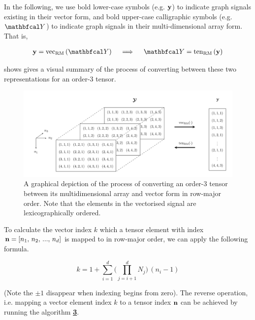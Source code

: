 In the following, we use bold lower-case symbols (e.g. $\mathbf{y}$) to indicate graph signals existing in their vector form, and bold upper-case calligraphic symbols (e.g. $\Yt$) to indicate graph signals in their multi-dimensional array form. That is, 

\begin{align*}
    \y = \vecrm{\Yt} \quad \implies \quad \Yt  = \tenrm{\y}
\end{align*}

 shows gives a visual summary of the process of converting between these two representations for an order-3 tensor. 


\begin{figure}[t]
    \begin{center}
        \includegraphics[width=\linewidth]{Figures/Tensor_Digaram.pdf}    
    \end{center}
    \caption[Conversion between a multidimensional array and a vector]{A graphical depiction of the process of converting an order-3 tensor between its multidimensional array and vector form in row-major order. Note that the elements in the vectorised signal are lexicographically ordered. }
    \label{fig:ten_to_vec}
\end{figure}


To calculate the vector index $k$ which a tensor element with index $\mathbf{n} = [n_1,\, n_2,\, ...,\, n_d]$ is mapped to in row-major order, we can apply the following formula.  

\begin{equation}
    \label{eq:vec}
    k = 1 + \sum_{i=1}^d \Big( \prod_{j=i+1}^d N_j \Big) \, (n_i - 1)
\end{equation}

(Note the $\pm1$ disappear when indexing begins from zero). The reverse operation, i.e. mapping a vector element index $k$ to a tensor index $\mathbf{n}$ can be achieved by running the algorithm \hyperlink{vectoten}{\textbf{3}}. 


